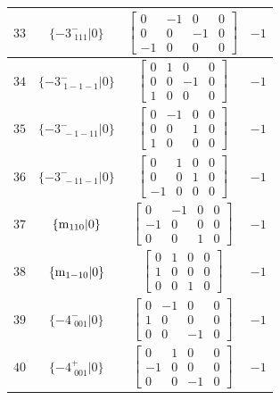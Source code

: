 \documentclass[fleqn,8pt]{jsarticle}
\begin{document}
\begin{longtable}{cccc}
$ 33 $ & $ \{-3^{-}_{\,\,111}|0\} $ & $ \begin{bmatrix} 0 & -1 & 0 & 0 \\ 0 & 0 & -1 & 0 \\ -1 & 0 & 0 & 0 \end{bmatrix} $ & $ -1 $ \\ \hline
$ 34 $ & $ \{-3^{-}_{\,\,1-1-1}|0\} $ & $ \begin{bmatrix} 0 & 1 & 0 & 0 \\ 0 & 0 & -1 & 0 \\ 1 & 0 & 0 & 0 \end{bmatrix} $ & $ -1 $ \\ \hline
$ 35 $ & $ \{-3^{-}_{\,\,-1-11}|0\} $ & $ \begin{bmatrix} 0 & -1 & 0 & 0 \\ 0 & 0 & 1 & 0 \\ 1 & 0 & 0 & 0 \end{bmatrix} $ & $ -1 $ \\ \hline
$ 36 $ & $ \{-3^{-}_{\,\,-11-1}|0\} $ & $ \begin{bmatrix} 0 & 1 & 0 & 0 \\ 0 & 0 & 1 & 0 \\ -1 & 0 & 0 & 0 \end{bmatrix} $ & $ -1 $ \\ \hline
$ 37 $ & $ \{{\rm m}_{110}|0\} $ & $ \begin{bmatrix} 0 & -1 & 0 & 0 \\ -1 & 0 & 0 & 0 \\ 0 & 0 & 1 & 0 \end{bmatrix} $ & $ -1 $ \\ \hline
$ 38 $ & $ \{{\rm m}_{1-10}|0\} $ & $ \begin{bmatrix} 0 & 1 & 0 & 0 \\ 1 & 0 & 0 & 0 \\ 0 & 0 & 1 & 0 \end{bmatrix} $ & $ -1 $ \\ \hline
$ 39 $ & $ \{-4^{-}_{\,\,001}|0\} $ & $ \begin{bmatrix} 0 & -1 & 0 & 0 \\ 1 & 0 & 0 & 0 \\ 0 & 0 & -1 & 0 \end{bmatrix} $ & $ -1 $ \\ \hline
$ 40 $ & $ \{-4^{+}_{\,\,001}|0\} $ & $ \begin{bmatrix} 0 & 1 & 0 & 0 \\ -1 & 0 & 0 & 0 \\ 0 & 0 & -1 & 0 \end{bmatrix} $ & $ -1 $ \\ \hline

\end{longtable}
\end{document}
